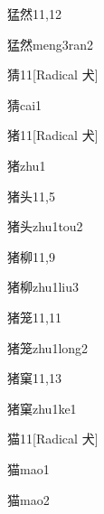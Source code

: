 \begin{entry}{猛然}{11,12}
  \begin{phonetics}{猛然}{meng3ran2}
  \end{phonetics}
\end{entry}

\begin{entry}{猜}{11}[Radical 犬]
  \begin{phonetics}{猜}{cai1}
  \end{phonetics}
\end{entry}

\begin{entry}{猪}{11}[Radical 犬]
  \begin{phonetics}{猪}{zhu1}
  \end{phonetics}
\end{entry}

\begin{entry}{猪头}{11,5}
  \begin{phonetics}{猪头}{zhu1tou2}
  \end{phonetics}
\end{entry}

\begin{entry}{猪柳}{11,9}
  \begin{phonetics}{猪柳}{zhu1liu3}
  \end{phonetics}
\end{entry}

\begin{entry}{猪笼}{11,11}
  \begin{phonetics}{猪笼}{zhu1long2}
  \end{phonetics}
\end{entry}

\begin{entry}{猪窠}{11,13}
  \begin{phonetics}{猪窠}{zhu1ke1}
  \end{phonetics}
\end{entry}

\begin{entry}{猫}{11}[Radical 犬]
  \begin{phonetics}{猫}{mao1}
  \end{phonetics}
  \begin{phonetics}{猫}{mao2}
  \end{phonetics}
\end{entry}

